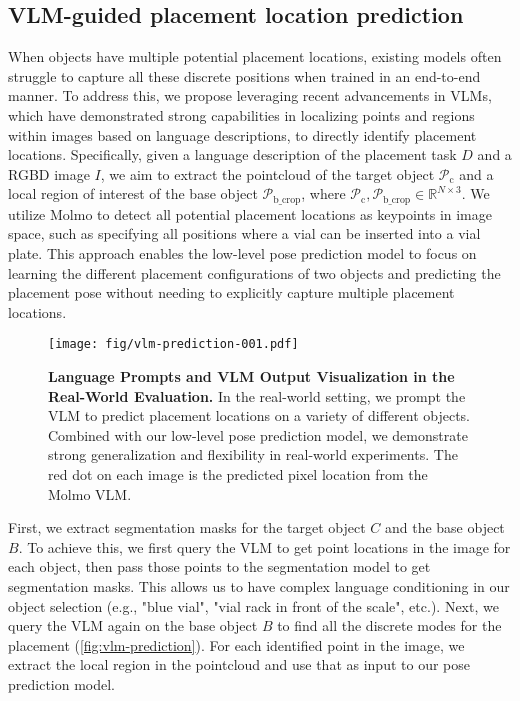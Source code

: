 \subsection{VLM-guided placement location prediction}
\label{subsec:detection_pipeline}
When objects have multiple potential placement locations, existing models often struggle to capture all these discrete positions when trained in an end-to-end manner. To address this, we propose leveraging recent advancements in VLMs, which have demonstrated strong capabilities in localizing points and regions within images based on language descriptions, to directly identify placement locations. Specifically, given a language description of the placement task \( D \) and a RGBD image \( I \), we aim to extract the pointcloud of the target object \( \mathcal{P}_{\text{c}}\) and a local region of interest of the base object \( \mathcal{P}_{\text{b\_crop}}\), where \( \mathcal{P}_{\text{c}}, \mathcal{P}_{\text{b\_crop}} \in \mathbb{R}^{N \times 3} \). We utilize Molmo \cite{deitke2024molmopixmoopenweights} to detect all potential placement locations as keypoints in image space, such as specifying all positions where a vial can be inserted into a vial plate. This approach enables the low-level pose prediction model to focus on learning the different placement configurations of two objects and predicting the placement pose without needing to explicitly capture multiple placement locations.


\begin{figure}[t]
    \centering
    \texttt{[image: fig/vlm-prediction-001.pdf]}
    \caption{\textbf{Language Prompts and VLM Output Visualization in the Real-World Evaluation.} In the real-world setting, we prompt the VLM to predict placement locations on a variety of different objects. Combined with our low-level pose prediction model, we demonstrate strong generalization and flexibility in real-world experiments. The red dot on each image is the predicted pixel location from the Molmo VLM. }
    \label{fig:vlm-prediction}
\end{figure}

First, we extract segmentation masks for the target object \( C \) and the base object \( B \). To achieve this, we first query the VLM to get point locations in the image for each object, then pass those points to the segmentation model to get segmentation masks.
This allows us to have complex language conditioning in our object selection (e.g., "blue vial", "vial rack in front of the scale", etc.).
%
Next, we query the VLM again on the base object \( B \) to find all the discrete modes for the placement (\autoref{fig:vlm-prediction}). For each identified point in the image, we extract the local region in the pointcloud and use that as input to our pose prediction model.

